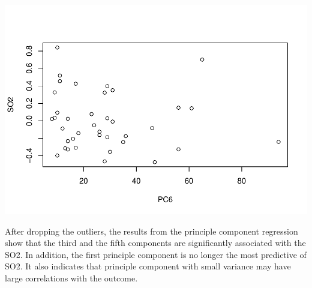 \documentclass[
]{article}
\begin{document}
\includegraphics[width=0.5\linewidth,height=0.8\textheight]{HUDM6122-Homework_03-Chenguang-Pan_files/figure-latex/unnamed-chunk-11-6}

After dropping the outliers, the results from the principle component
regression show that the third and the fifth components are
significantly associated with the SO2. In addition, the first principle
component is no longer the most predictive of SO2. It also indicates
that principle component with small variance may have large correlations
with the outcome.
\end{document}
